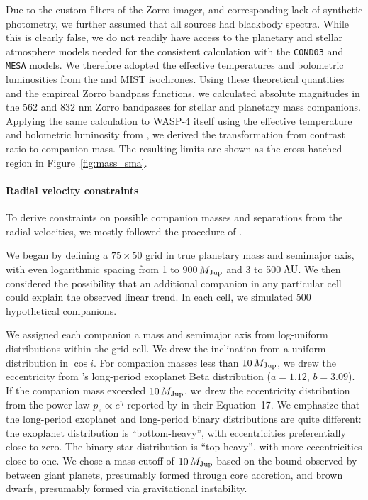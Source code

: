 \documentclass[12pt,twocolumn,tighten]{aastex62}
\begin{document}
Due to the custom filters of the Zorro imager, and corresponding lack
of synthetic photometry, we further assumed that all sources had
blackbody spectra. While this is clearly false, we do not readily have
access to the planetary and stellar atmosphere models needed for the
consistent calculation with the \texttt{COND03} and \texttt{MESA}
models.  We therefore adopted the effective temperatures and
bolometric luminosities from the \citet{baraffe_evolutionary_2003} and
MIST isochrones.  Using these theoretical quantities and the empircal
Zorro bandpass functions, we calculated absolute magnitudes in the 562
and 832 nm Zorro bandpasses for stellar and planetary mass companions.
Applying the same calculation to WASP-4 itself using the effective
temperature and bolometric luminosity from
, we derived the transformation from
contrast ratio to companion mass.  The resulting limits are shown as
the cross-hatched region in Figure~\ref{fig:mass_sma}.


\paragraph{Radial velocity constraints}

To derive constraints on possible companion masses and separations
from the radial velocities, we mostly followed the procedure of
\citet{bryan_excess_2019}. 

We began by defining a $75\times50$ grid in true planetary mass and
semimajor axis, with even logarithmic spacing from 1 to 900$\,$$M_{\rm
Jup}$ and 3 to 500$\,$${\rm AU}$.  We then considered the possibility
that an additional companion in any particular cell could explain the
observed linear trend.  In each cell, we simulated 500 hypothetical
companions.

We assigned each companion a mass and semimajor axis from log-uniform
distributions within the grid cell. We drew the inclination from a
uniform distribution in $\cos i$.  For companion masses less than
$10\,M_{\rm Jup}$, we drew the eccentricity from
\citet{kipping_beta_2013}'s long-period exoplanet Beta distribution
($a=1.12$, $b=3.09$).  If the companion mass exceeded $10\,M_{\rm
Jup}$, we drew the eccentricity distribution from the power-law $p_e
\propto e^\eta$ reported by \citet{moe_mind_2017} in their
Equation~17.  We emphasize that the long-period exoplanet and
long-period binary distributions are quite different: the exoplanet
distribution is ``bottom-heavy'', with eccentricities preferentially
close to zero. The binary star distribution is ``top-heavy'', with
more eccentricities close to one.  We chose a mass cutoff of
$10\,M_{\rm Jup}$ based on the bound observed by
\citet{schlaufman_evidence_2018} between giant planets, presumably
formed through core accretion, and brown dwarfs, presumably formed via
gravitational instability.
\end{document}
